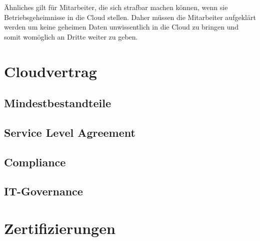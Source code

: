 \"Ahnliches gilt f\"ur Mitarbeiter, die sich strafbar machen k\"onnen, wenn sie Betriebsgeheimnisse in die Cloud stellen. Daher m\"ussen die Mitarbeiter aufgekl\"art werden um keine geheimen Daten unwissentlich in die Cloud zu bringen und somit wom\"oglich an Dritte weiter zu geben.

\section{Cloudvertrag}
\subsection{Mindestbestandteile}
\subsection{Service Level Agreement}
\subsection{Compliance}
\subsection{IT-Governance}
\section{Zertifizierungen}


  